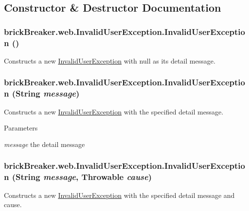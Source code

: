 \subsection{Constructor \& Destructor Documentation}
\hypertarget{classbrick_breaker_1_1web_1_1_invalid_user_exception_a500ab07a78ed1ea1f51c685772ec3b11}{
\subsubsection[{InvalidUserException}]{\setlength{\rightskip}{0pt plus 5cm}brickBreaker.web.InvalidUserException.InvalidUserException ()}}
\label{classbrick_breaker_1_1web_1_1_invalid_user_exception_a500ab07a78ed1ea1f51c685772ec3b11}
Constructs a new {\ttfamily \hyperlink{classbrick_breaker_1_1web_1_1_invalid_user_exception}{InvalidUserException}} with {\ttfamily null} as its detail message. \hypertarget{classbrick_breaker_1_1web_1_1_invalid_user_exception_a28a46f03e800b69aca69071687c4a53d}{
\subsubsection[{InvalidUserException}]{\setlength{\rightskip}{0pt plus 5cm}brickBreaker.web.InvalidUserException.InvalidUserException (String {\em message})}}
\label{classbrick_breaker_1_1web_1_1_invalid_user_exception_a28a46f03e800b69aca69071687c4a53d}
Constructs a new {\ttfamily \hyperlink{classbrick_breaker_1_1web_1_1_invalid_user_exception}{InvalidUserException}} with the specified detail message.


\begin{DoxyParams}{Parameters}
\item[{\em message}]the detail message \end{DoxyParams}
\hypertarget{classbrick_breaker_1_1web_1_1_invalid_user_exception_a1b99af54f90e802a18f6eb4b65cfa5aa}{
\subsubsection[{InvalidUserException}]{\setlength{\rightskip}{0pt plus 5cm}brickBreaker.web.InvalidUserException.InvalidUserException (String {\em message}, \/  Throwable {\em cause})}}
\label{classbrick_breaker_1_1web_1_1_invalid_user_exception_a1b99af54f90e802a18f6eb4b65cfa5aa}
Constructs a new {\ttfamily \hyperlink{classbrick_breaker_1_1web_1_1_invalid_user_exception}{InvalidUserException}} with the specified detail message and cause.


